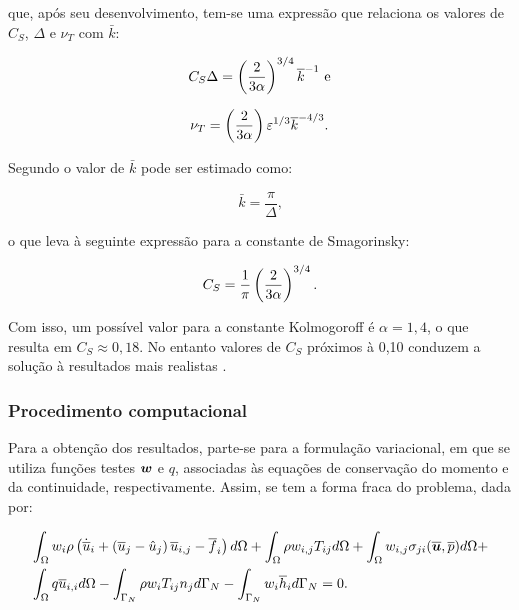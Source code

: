 \noindent que, após seu desenvolvimento, tem-se uma expressão que relaciona os valores de $C_S$, $\Delta$ e $\nu_T$ com $\bar{k}$:

\begin{equation}
    C_S\Delta=\left({\frac{2}{3\alpha}}\right)^{3/4}\overline{k}^{-1}\text{ e}
\end{equation}

\begin{equation}
    \nu_T=\left({\frac{2}{3\alpha}}\right)\varepsilon^{1/3}\overline{k}^{-4/3}\text{.}
\end{equation}

Segundo  o valor de $\bar{k}$ pode ser estimado como:

\begin{equation}
    \bar{k}=\frac{\pi}{\Delta}\text{,}
\end{equation}

\noindent o que leva à seguinte expressão para a constante de Smagorinsky:

\begin{equation}
    C_S=\frac{1}{\pi}\left({\frac{2}{3\alpha}}\right)^{3/4}\text{.}
\end{equation}

Com isso, um possível valor para a constante Kolmogoroff é $\alpha=1,4$, o que resulta em $C_S\approx0,18$. No entanto valores de $C_S$ próximos à 0,10 conduzem a solução à resultados mais realistas \cite{hughes2000large,bailly2015turbulence,katopodes2019free}.

\subsubsection{Procedimento computacional} \label{LES-PC}

Para a obtenção dos resultados, parte-se para a formulação variacional, em que se utiliza funções testes $\boldsymbol{w}$ e $q$, associadas às equações de conservação do momento e da continuidade, respectivamente. Assim, se tem a forma fraca do problema, dada por:

\begin{equation}
    \begin{split}
        &\int_{\Omega}{w_i\rho\left({\dot{\overline{u}}_i+\left({\overline{u}_{j}-\hat{u}_{j}}\right)\overline{u}_{i,j}-\overline{f}_i}\right) d\Omega}+\int_{\Omega}{\rho w_{i,j}T_{ij} d\Omega}+\int_{\Omega}{w_{i,j}\sigma_{ji}(\boldsymbol{\overline{u}},\overline{p}) d\Omega}+\\
        &\int_{\Omega}{q\overline{u}_{i,i} d\Omega}-\int_{\Gamma_N}{\rho w_iT_{ij}n_j d\Gamma_N}-\int_{\Gamma_N}{w_i\overline{h}_i d\Gamma_N}=0\text{.}
    \end{split}
\end{equation}

